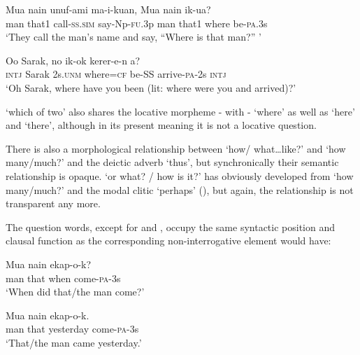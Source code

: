\ea%
\label{ex:3:x1852}
\gll Mua nain unuf-ami ma-i-kuan, {\textquotedbl}Mua nain  ik-ua?{\textquotedbl} \\
man that1 call-\textsc{ss}.\textsc{sim} say-Np-\textsc{fu}.3p man that1 where be-\textsc{pa}.3s\\
\glt`They call the man's name and say, ``Where is that man?'' '
\z

\ea%
\label{ex:3:x1854}
\gll Oo Sarak, no  ik-ok kerer-e-n a? \\
\textsc{intj} Sarak 2s.\textsc{unm} where=\textsc{cf} be-SS arrive-\textsc{pa}-2s \textsc{intj}\\
\glt`Oh Sarak, where have you been (lit: where were you and arrived)?'
\z

 `which of two' also shares the locative morpheme - with - `where' as well as  `here' and  `there', although in its present meaning it is not a locative question.

There is also a morphological relationship between  `how/ what{\dots}like?' and  `how many/much?' and the deictic adverb  `thus', but synchronically their semantic relationship is opaque.  `or what? / how is it?' has obviously developed from  `how many/much?' and the modal clitic  `perhaps' (), but again, the relationship is not transparent any more.

The question words, except for  and , occupy the same syntactic position and clausal function as the corresponding non-interrogative element would have:

\ea%
\label{ex:3:x520}
\gll Mua nain  ekap-o-k? \\
man that when come-\textsc{pa}-3s\\
\glt`When did that/the man come?'
\z

\ea%
\label{ex:3:x647}
\gll Mua nain  ekap-o-k. \\
man that yesterday come-\textsc{pa}-3s\\
\glt`That/the man came yesterday.'
\z

